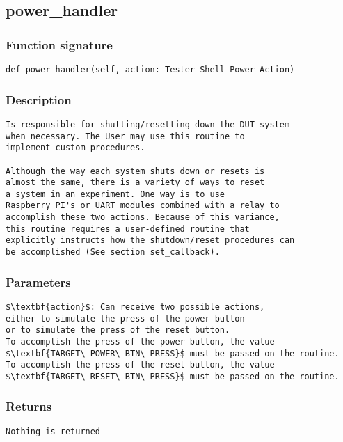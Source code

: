 \subsection{power\_handler}


\subsubsection{Function signature}
\begin{lstlisting}
def power_handler(self, action: Tester_Shell_Power_Action)
\end{lstlisting}

\subsubsection{Description}
\begin{lstlisting}[mathescape=true, keywordstyle=\color{black}, showstringspaces=false]
Is responsible for shutting/resetting down the DUT system 
when necessary. The User may use this routine to 
implement custom procedures. 

Although the way each system shuts down or resets is 
almost the same, there is a variety of ways to reset 
a system in an experiment. One way is to use 
Raspberry PI's or UART modules combined with a relay to 
accomplish these two actions. Because of this variance, 
this routine requires a user-defined routine that 
explicitly instructs how the shutdown/reset procedures can 
be accomplished (See section set_callback).
\end{lstlisting}

\subsubsection{Parameters}
\begin{lstlisting}[mathescape=true, keywordstyle=\color{black}]
$\textbf{action}$: Can receive two possible actions, 
either to simulate the press of the power button 
or to simulate the press of the reset button. 
To accomplish the press of the power button, the value 
$\textbf{TARGET\_POWER\_BTN\_PRESS}$ must be passed on the routine. 
To accomplish the press of the reset button, the value 
$\textbf{TARGET\_RESET\_BTN\_PRESS}$ must be passed on the routine. 
\end{lstlisting}

\subsubsection{Returns}
\begin{lstlisting}[mathescape=true, keywordstyle=\color{black}]
Nothing is returned
\end{lstlisting}


